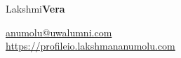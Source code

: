 \documentclass{res}
\begin{document}
	\hspace*{-0.05\textwidth}
	\begin{minipage}[t]{0.6\textwidth}
	\begin{flushleft}
	\vspace*{\fill}
	{\fontsize{45}{45}\selectfont Lakshmi\textbf{Vera}}
	\end{flushleft}
	\end{minipage}
	\begin{minipage}[t]{0.44\textwidth}
	\begin{flushright}
	\href{mailto:anumolu@uwalumni.com}{anumolu@uwalumni.com} \\ \url{https://profileio.lakshmananumolu.com} \\ 
	\end{flushright}
	\end{minipage}
\end{document}
